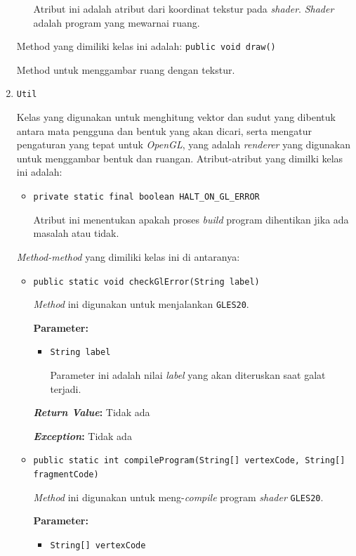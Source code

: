 \begin{enumerate}
\begin{itemize}
  			Atribut ini adalah atribut dari koordinat tekstur pada \textit{shader}. \textit{Shader} adalah program yang mewarnai ruang.
		\end{itemize}
		
	Method yang dimiliki kelas ini adalah:
		\texttt{public void draw()}
			
		Method untuk menggambar ruang dengan tekstur.
	\item \texttt{Util}
	
	Kelas yang digunakan untuk menghitung vektor dan sudut yang dibentuk antara mata pengguna dan bentuk yang akan dicari, serta mengatur pengaturan yang tepat untuk \textit{OpenGL}, yang adalah {\it renderer} yang digunakan untuk menggambar bentuk dan ruangan. Atribut-atribut yang dimilki kelas ini adalah:
	\begin{itemize}
		\item \texttt{private static final boolean HALT\_ON\_GL\_ERROR}
		
		Atribut ini menentukan apakah proses \textit{build} program dihentikan jika ada masalah atau tidak.
	\end{itemize}	 
	
	\textit{Method-method} yang dimiliki kelas ini di antaranya:
	\begin{itemize}
		\item \texttt{public static void checkGlError(String label)}
		
		\textit{Method} ini digunakan untuk menjalankan \texttt{GLES20}.
		
		\textbf{Parameter:}
		\begin{itemize}
			\item \texttt{String label}
			
			Parameter ini adalah nilai \textit{label} yang akan diteruskan saat galat terjadi.			
		\end{itemize}
		\textbf{\textit{Return Value}:} Tidak ada
			
		\textbf{\textit{Exception}:} Tidak ada		
		
		\item \texttt{public static int compileProgram(String[] vertexCode, String[] fragmentCode)}
		
		\textit{Method} ini digunakan untuk meng-\textit{compile} program \textit{shader} \texttt{GLES20}.
		
		\textbf{Parameter:}
		\begin{itemize}
			\item \texttt{String[] vertexCode}
			

\end{itemize}
\end{itemize}
\end{enumerate}
